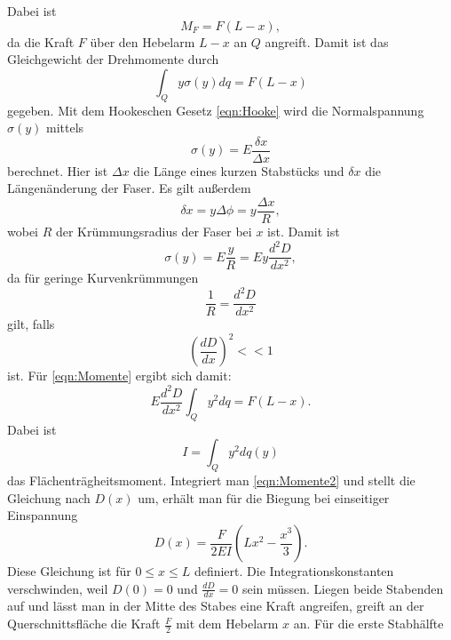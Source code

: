Dabei ist
\begin{equation}
M_{F} = F (L-x),
\end{equation}
da die Kraft $F$ über den Hebelarm $L-x$ an $Q$ angreift.
Damit ist das Gleichgewicht der Drehmomente durch
\begin{equation}
\int_{Q} y \sigma(y) dq = F(L-x)
\label{eqn:Momente}
\end{equation}
gegeben.
Mit dem Hookeschen Gesetz \eqref{eqn:Hooke} wird die Normalspannung
$\sigma(y)$ mittels
\begin{equation}
\sigma(y) = E \frac{\delta x}{\Delta x}
\end{equation}
berechnet. Hier ist $\Delta x$ die Länge eines kurzen Stabstücks
und $\delta x$ die Längenänderung der Faser.
Es gilt außerdem
\begin{equation}
\delta x = y \Delta \phi = y \frac{\Delta x}{R},
\end{equation}
wobei $R$ der Krümmungsradius der Faser bei $x$ ist.
Damit ist
\begin{equation}
\sigma(y) = E \frac{y}{R} = E y \frac{d^2D}{dx^2},
\end{equation}
da für geringe Kurvenkrümmungen
\begin{equation}
\frac{1}{R} = \frac{d^2D}{dx^2} %
\end{equation}
gilt, falls
\begin{equation}
(\frac{dD}{dx})^2 << 1
\end{equation}
ist. Für \eqref{eqn:Momente} ergibt sich damit:
\begin{equation}
E \frac{d^2D}{dx^2} \int_{Q} y^2 dq = F(L-x).
\label{eqn:Momente2}
\end{equation}
Dabei ist
\begin{equation}
I = \int_{Q} y^2 dq(y)
\end{equation}
das Flächenträgheitsmoment.
Integriert man \eqref{eqn:Momente2} und stellt die Gleichung
nach $D(x)$ um, erhält man für die Biegung bei einseitiger Einspannung
\begin{equation}
D(x) = \frac{F}{2EI} (Lx^2- \frac{x^3}{3}).
\label{eqn:D1}
\end{equation}
Diese Gleichung ist für $0 \leq x \leq L$ definiert.
Die Integrationskonstanten verschwinden, weil $D(0) = 0$ und $\frac{dD}{dx} = 0$ sein müssen.
Liegen beide Stabenden auf und lässt man in der Mitte des Stabes
eine Kraft angreifen, greift an der Querschnittsfläche die Kraft
$\frac{F}{2}$ mit dem Hebelarm $x$ an. Für die erste Stabhälfte
